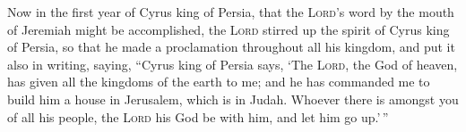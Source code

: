  Now in the first year of Cyrus king of Persia, that the
\textsc{Lord}'s word by the mouth of Jeremiah might be accomplished, the
\textsc{Lord} stirred up the spirit of Cyrus king of Persia, so that he
made a proclamation throughout all his kingdom, and put it also in
writing, saying,  ``Cyrus king of Persia says, `The
\textsc{Lord}, the God of heaven, has given all the kingdoms of the
earth to me; and he has commanded me to build him a house in Jerusalem,
which is in Judah. Whoever there is amongst you of all his people, the
\textsc{Lord} his God be with him, and let him go up.'\,''

